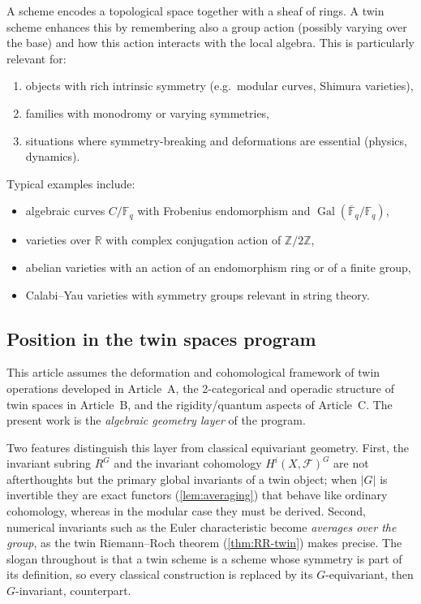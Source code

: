 \documentclass[11pt,a4paper]{article}
\numberwithin{equation}{section}
\newcommand{\R}{\mathbb{R}}
\newcommand{\Z}{\mathbb{Z}}
\DeclareMathOperator{\Gal}{Gal}
\newcommand{\Fcal}{\mathcal{F}}
\newcommand{\abs}[1]{\left\lvert #1 \right\rvert}
\begin{document}
	\begin{remark}
		A scheme encodes a topological space together with a sheaf of rings.
		A twin scheme enhances this by remembering also a group action (possibly varying over the base)
		and how this action interacts with the local algebra.
		This is particularly relevant for:
		\begin{enumerate}[label=(\alph*)]
			\item objects with rich intrinsic symmetry (e.g.\ modular curves, Shimura varieties),
			\item families with monodromy or varying symmetries,
			\item situations where symmetry-breaking and deformations are essential (physics, dynamics).
		\end{enumerate}
	\end{remark}
	
	\begin{example}
		Typical examples include:
		\begin{itemize}
			\item algebraic curves $C/\mathbb{F}_q$ with Frobenius endomorphism and $\Gal(\overline{\mathbb{F}}_q/\mathbb{F}_q)$,
			\item varieties over $\R$ with complex conjugation action of $\Z/2\Z$,
			\item abelian varieties with an action of an endomorphism ring or of a finite group,
			\item Calabi--Yau varieties with symmetry groups relevant in string theory.
		\end{itemize}
	\end{example}
	
	\subsection{Position in the twin spaces program}
	
	This article assumes the deformation and cohomological framework of twin operations developed in 
	Article~A, the 2-categorical and operadic structure of twin spaces in Article~B, and the rigidity/quantum
	aspects of Article~C. The present work is the \emph{algebraic geometry layer} of the program.
	
	Two features distinguish this layer from classical equivariant geometry. First, the invariant subring $R^G$
	and the invariant cohomology $H^i(X,\Fcal)^G$ are not afterthoughts but the primary global invariants of a
	twin object; when $\abs{G}$ is invertible they are exact functors (\cref{lem:averaging}) that behave like
	ordinary cohomology, whereas in the modular case they must be derived. Second, numerical invariants such as
	the Euler characteristic become \emph{averages over the group}, as the twin Riemann--Roch theorem
	(\cref{thm:RR-twin}) makes precise. The slogan throughout is that a twin scheme is a scheme whose symmetry is
	part of its definition, so every classical construction is replaced by its $G$-equivariant, then
	$G$-invariant, counterpart.
\end{document}

